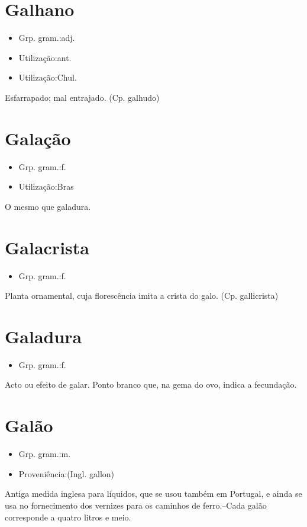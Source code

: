 \section{Galhano}
\begin{itemize}
\item {Grp. gram.:adj.}
\end{itemize}
\begin{itemize}
\item {Utilização:ant.}
\end{itemize}
\begin{itemize}
\item {Utilização:Chul.}
\end{itemize}
Esfarrapado; mal entrajado.
(Cp. \textunderscore galhudo\textunderscore )
\section{Galação}
\begin{itemize}
\item {Grp. gram.:f.}
\end{itemize}
\begin{itemize}
\item {Utilização:Bras}
\end{itemize}
O mesmo que \textunderscore galadura\textunderscore .
\section{Galacrista}
\begin{itemize}
\item {Grp. gram.:f.}
\end{itemize}
Planta ornamental, cuja florescência imita a crista do galo.
(Cp. \textunderscore gallicrista\textunderscore )
\section{Galadura}
\begin{itemize}
\item {Grp. gram.:f.}
\end{itemize}
Acto ou efeito de galar.
Ponto branco que, na gema do ovo, indica a fecundação.
\section{Galão}
\begin{itemize}
\item {Grp. gram.:m.}
\end{itemize}
\begin{itemize}
\item {Proveniência:(Ingl. \textunderscore gallon\textunderscore )}
\end{itemize}
Antiga medida inglesa para líquidos, que se usou também em Portugal, e ainda se usa no fornecimento dos vernizes para os caminhos de ferro.--Cada galão corresponde a quatro litros e meio.
